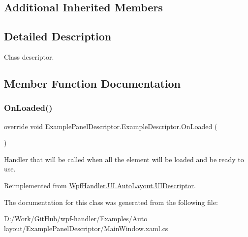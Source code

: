 \subsection*{Additional Inherited Members}


\subsection{Detailed Description}
Class descriptor. 



\subsection{Member Function Documentation}
\mbox{\label{class_example_panel_descriptor_1_1_example_descriptor_a242e44f686dc27261ceff4fa514f68d7}} 
\subsubsection{\texorpdfstring{On\+Loaded()}{OnLoaded()}}
{\footnotesize\ttfamily override void Example\+Panel\+Descriptor.\+Example\+Descriptor.\+On\+Loaded (\begin{DoxyParamCaption}{ }\end{DoxyParamCaption})\hspace{0.3cm}{\ttfamily [virtual]}}



Handler that will be called when all the element will be loaded and be ready to use. 



Reimplemented from \mbox{\hyperlink{class_wpf_handler_1_1_u_i_1_1_auto_layout_1_1_u_i_descriptor_a6dbda96f0d1b9f65fd1c61e0b8a5bb6b}{Wpf\+Handler.\+U\+I.\+Auto\+Layout.\+U\+I\+Descriptor}}.



The documentation for this class was generated from the following file\+:\begin{DoxyCompactItemize}
\item 
D\+:/\+Work/\+Git\+Hub/wpf-\/handler/\+Examples/\+Auto layout/\+Example\+Panel\+Descriptor/Main\+Window.\+xaml.\+cs\end{DoxyCompactItemize}
